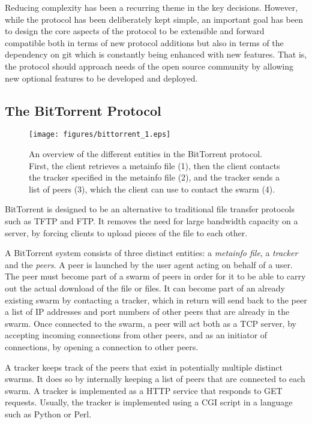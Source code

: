 Reducing complexity has been a recurring theme in the key decisions.
However, while the protocol has been deliberately kept simple, an
important goal has been to design the core aspects of the protocol to
be extensible and forward compatible both in terms of new protocol
additions but also in terms of the dependency on git which is
constantly being enhanced with new features. That is, the protocol should
approach needs of the open source community by allowing new optional
features to be developed and deployed.


\subsection{The BitTorrent Protocol} \label{sec:bittorrent}
 
\begin{figure}[!tbp]
\begin{center}
\texttt{[image: figures/bittorrent\_1.eps]}
 
\caption[BitTorrent overview] {An overview of the different entities in
the BitTorrent protocol.  First, the client retrieves a metainfo file (1), then the client contacts
the tracker specified in the metainfo file (2), and the tracker sends a list of
peers (3), which the client can use to contact the swarm (4).}
 
\label{fig:bittorrent}
\end{center}
\end{figure}

BitTorrent is designed to be an alternative to traditional file transfer
protocols such as TFTP and FTP. It removes the need for large bandwidth
capacity on a server, by forcing clients to upload pieces of the file
to each other.

A BitTorrent system consists of three distinct entities: a
\emph{metainfo file}, a \emph{tracker} and the \emph{peers}.  A peer
is launched by the user agent acting on behalf of a user. The peer
must become part of a swarm of peers in order for it to be able to
carry out the actual download of the file or files. It can become part
of an already existing swarm by contacting a tracker, which in return
will send back to the peer a list of IP addresses and port numbers of
other peers that are already in the swarm. Once connected to the
swarm, a peer will act both as a TCP server, by accepting incoming
connections from other peers, and as an initiator of connections, by
opening a connection to other peers.

A tracker keeps track of the peers that exist in potentially multiple
distinct swarms. It does so by internally keeping a list of peers that
are connected to each swarm. A tracker is implemented as a HTTP
service that responds to GET requests.  Usually, the tracker is
implemented using a CGI script in a language such as Python or Perl.


